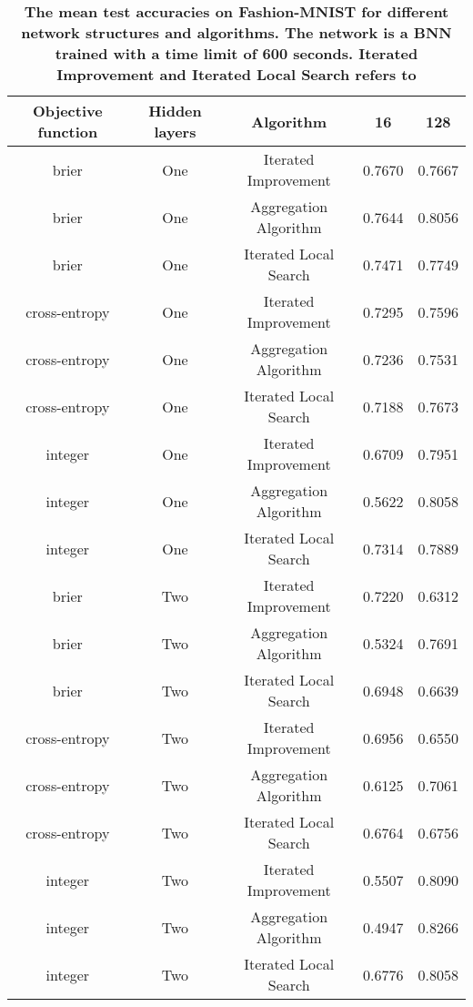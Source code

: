 \begin{center}
\begin{table}[!tb]
\centering
\begin{tabular}{|c|c|c|c|c|}
  \hline
Objective function & Hidden layers & Algorithm & 16 & 128 \\ 
  \hline
brier & One & Iterated Improvement & 0.7670 & 0.7667 \\ 
   \hline
brier & One & Aggregation Algorithm & 0.7644 & 0.8056 \\ 
   \hline
brier & One & Iterated Local Search & 0.7471 & 0.7749 \\ 
   \hline
cross-entropy & One & Iterated Improvement & 0.7295 & 0.7596 \\ 
   \hline
cross-entropy & One & Aggregation Algorithm & 0.7236 & 0.7531 \\ 
   \hline
cross-entropy & One & Iterated Local Search & 0.7188 & 0.7673 \\ 
   \hline
integer & One & Iterated Improvement & 0.6709 & 0.7951 \\ 
   \hline
integer & One & Aggregation Algorithm & 0.5622 & 0.8058 \\ 
   \hline
integer & One & Iterated Local Search & 0.7314 & 0.7889 \\ 
   \hline
brier & Two & Iterated Improvement & 0.7220 & 0.6312 \\ 
   \hline
brier & Two & Aggregation Algorithm & 0.5324 & 0.7691 \\ 
   \hline
brier & Two & Iterated Local Search & 0.6948 & 0.6639 \\ 
   \hline
cross-entropy & Two & Iterated Improvement & 0.6956 & 0.6550 \\ 
   \hline
cross-entropy & Two & Aggregation Algorithm & 0.6125 & 0.7061 \\ 
   \hline
cross-entropy & Two & Iterated Local Search & 0.6764 & 0.6756 \\ 
   \hline
integer & Two & Iterated Improvement & 0.5507 & 0.8090 \\ 
   \hline
integer & Two & Aggregation Algorithm & 0.4947 & 0.8266 \\ 
   \hline
integer & Two & Iterated Local Search & 0.6776 & 0.8058 \\ 
   \hline
\end{tabular}
\caption{\small{\textbf{The mean test accuracies on Fashion-MNIST for different network structures and algorithms. The network is a
            BNN trained with a time limit of 600 seconds. Iterated Improvement and Iterated Local Search refers to
}}}
\end{table}
\end{center}
